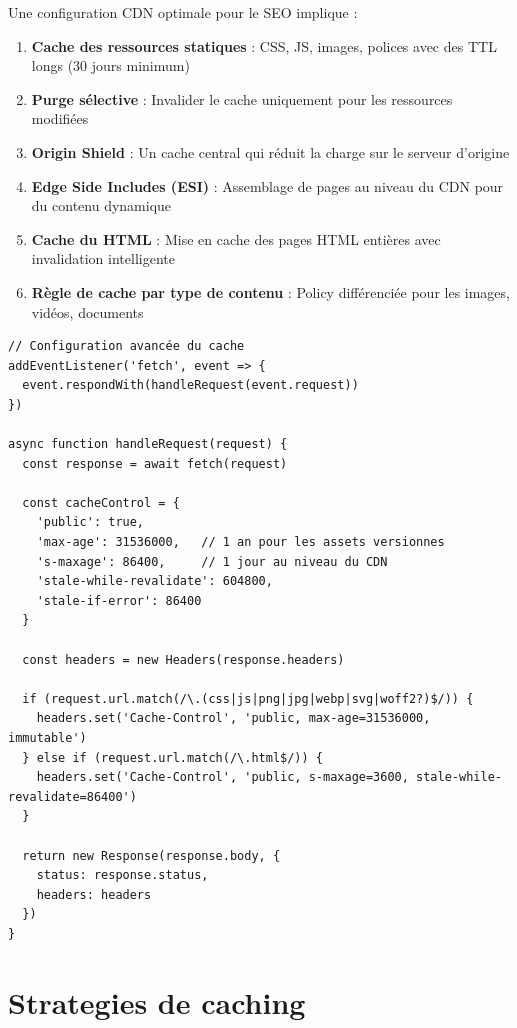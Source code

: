 \documentclass[12pt,a4paper,twoside]{report}
\begin{document}
Une configuration CDN optimale pour le SEO implique :

\begin{enumerate}
    \item \textbf{Cache des ressources statiques} : CSS, JS, images, polices avec des TTL longs (30 jours minimum)
    \item \textbf{Purge sélective} : Invalider le cache uniquement pour les ressources modifiées
    \item \textbf{Origin Shield} : Un cache central qui réduit la charge sur le serveur d'origine
    \item \textbf{Edge Side Includes (ESI)} : Assemblage de pages au niveau du CDN pour du contenu dynamique
    \item \textbf{Cache du HTML} : Mise en cache des pages HTML entières avec invalidation intelligente
    \item \textbf{Règle de cache par type de contenu} : Policy différenciée pour les images, vidéos, documents
\end{enumerate}

\begin{lstlisting}[style=code,caption={Exemple de configuration des en-têtes de cache avec Cloudflare Workers}]
// Configuration avancée du cache
addEventListener('fetch', event => {
  event.respondWith(handleRequest(event.request))
})

async function handleRequest(request) {
  const response = await fetch(request)

  const cacheControl = {
    'public': true,
    'max-age': 31536000,   // 1 an pour les assets versionnes
    's-maxage': 86400,     // 1 jour au niveau du CDN
    'stale-while-revalidate': 604800,
    'stale-if-error': 86400
  }

  const headers = new Headers(response.headers)

  if (request.url.match(/\.(css|js|png|jpg|webp|svg|woff2?)$/)) {
    headers.set('Cache-Control', 'public, max-age=31536000, immutable')
  } else if (request.url.match(/\.html$/)) {
    headers.set('Cache-Control', 'public, s-maxage=3600, stale-while-revalidate=86400')
  }

  return new Response(response.body, {
    status: response.status,
    headers: headers
  })
}
\end{lstlisting}

\section{Strategies de caching}
\end{document}
